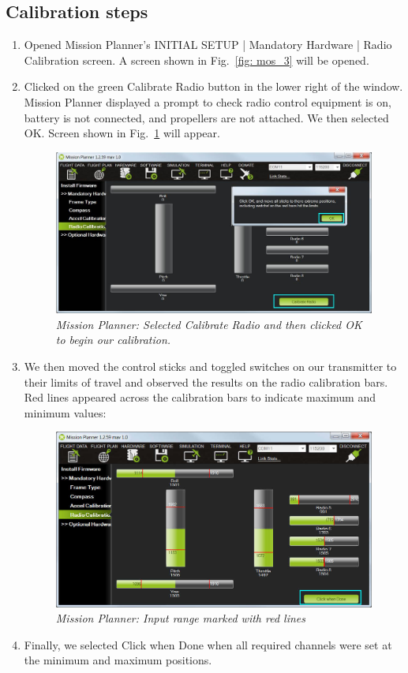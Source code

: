 \subsection{Calibration steps}
\begin{enumerate}
	\item Opened Mission Planner’s INITIAL SETUP | Mandatory Hardware | Radio Calibration screen. A screen shown in Fig.~\ref{fig: mos_3} will be opened.
	\item Clicked on the green Calibrate Radio button in the lower right of the window.
Mission Planner displayed a prompt to check radio control equipment is on, battery is not connected, and propellers are not attached. We then selected OK. Screen shown in Fig.~\ref{fig: mos_4} will appear.
\begin{figure}[h]
	\includegraphics[width=1.0\linewidth]{mp_calibrate_radio}
	\centering
	\caption{\label{fig: mos_4}\textit{Mission Planner: Selected Calibrate Radio and then clicked OK to begin our calibration.}}
\end{figure}
	\item We then moved the control sticks and toggled switches on our transmitter to their limits of travel and observed the results on the radio calibration bars. Red lines appeared across the calibration bars to indicate maximum and minimum values:

\begin{figure}[h]
	\includegraphics[width=1.0\linewidth]{mp_radio_calibration_click_when_done}
	\centering
	\caption{\label{fig: mos_5}\textit{Mission Planner: Input range marked with red lines}}
\end{figure}
\item Finally, we selected Click when Done when all required channels were set at the minimum and maximum positions.


\end{enumerate}
